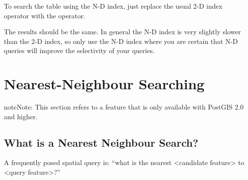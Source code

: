 \documentclass[a4paper,11pt,english]{sphinxmanual}
\begin{document}
To search the  table using the N-D index, just replace the usual \sphinxcode{\sphinxupquote{\&\&}} 2-D index operator with the \sphinxcode{\sphinxupquote{\&\&\&}} operator.

\begin{sphinxVerbatim}[commandchars=\\\{\}]
  
 
  

  
 
  
\end{sphinxVerbatim}

The results should be the same. In general the N-D index is very slightly slower than the 2-D index, so only use the N-D index where you are certain that N-D queries will improve the selectivity of your queries.


\section{Nearest-Neighbour Searching}
\label{\detokenize{advanced:nearest-neighbour-searching}}\label{\detokenize{advanced:knn}}
\begin{sphinxadmonition}{note}{Note:}
This section refers to a feature that is only available with PostGIS 2.0 and higher.
\end{sphinxadmonition}


\subsection{What is a Nearest Neighbour Search?}
\label{\detokenize{advanced:what-is-a-nearest-neighbour-search}}
A frequently posed spatial query is: “what is the nearest \textless{}candidate feature\textgreater{} to \textless{}query feature\textgreater{}?”
\end{document}
